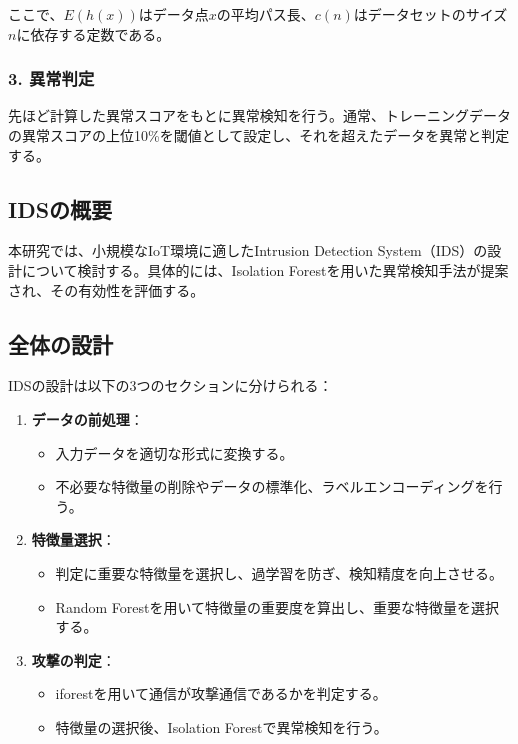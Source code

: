 \documentclass{css}
\begin{document}
ここで、$E(h(x))$はデータ点$x$の平均パス長、$c(n)$はデータセットのサイズ$n$に依存する定数である。

\subsubsection*{3. 異常判定}
先ほど計算した異常スコアをもとに異常検知を行う。通常、トレーニングデータの異常スコアの上位10\%を閾値として設定し、それを超えたデータを異常と判定する。


\subsection{IDSの概要}
本研究では、小規模なIoT環境に適したIntrusion Detection System（IDS）の設計について検討する。具体的には、Isolation Forestを用いた異常検知手法が提案され、その有効性を評価する。

\subsection{全体の設計}
IDSの設計は以下の3つのセクションに分けられる：
\begin{enumerate}
    \item \textbf{データの前処理}：
        \begin{itemize}
            \item 入力データを適切な形式に変換する。
            \item 不必要な特徴量の削除やデータの標準化、ラベルエンコーディングを行う。
        \end{itemize}
    \item \textbf{特徴量選択}：
        \begin{itemize}
            \item 判定に重要な特徴量を選択し、過学習を防ぎ、検知精度を向上させる。
            \item Random Forestを用いて特徴量の重要度を算出し、重要な特徴量を選択する。
        \end{itemize}
    \item \textbf{攻撃の判定}：
        \begin{itemize}
            \item iforestを用いて通信が攻撃通信であるかを判定する。
            \item 特徴量の選択後、Isolation Forestで異常検知を行う。
        \end{itemize}
\end{enumerate}
\end{document}
